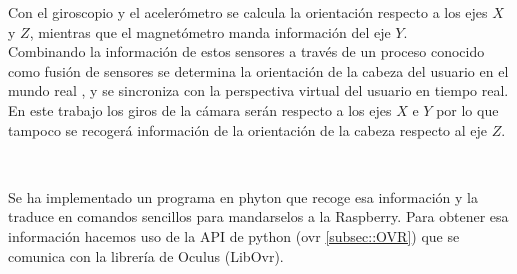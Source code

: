 \documentclass[twoside, 11pt]{epstfg}
\begin{document}
Con el giroscopio y el acelerómetro se calcula la orientación respecto a los ejes $X$ y $Z$, mientras que el magnetómetro manda información del eje $Y$.\\Combinando la información de estos sensores a través de un proceso conocido como fusión de sensores se determina la orientación de la cabeza del usuario en el mundo real , y se sincroniza con la perspectiva virtual del usuario en tiempo real.\\
En este trabajo los giros de la cámara serán respecto a los ejes $X$ e $Y$ por lo que tampoco se recogerá información de la orientación de la cabeza respecto al eje $Z$.

\begin{figure}[H]
	\centering
	 \\
	
	\caption{}
	\label{OculusDk2} 
\end{figure}



 
Se ha implementado un programa en phyton que recoge esa información y la traduce en comandos sencillos para mandarselos a la Raspberry. Para obtener esa información hacemos uso de la API de python (ovr \ref{subsec::OVR}) que se comunica con la librería de Oculus (LibOvr).
\end{document}

